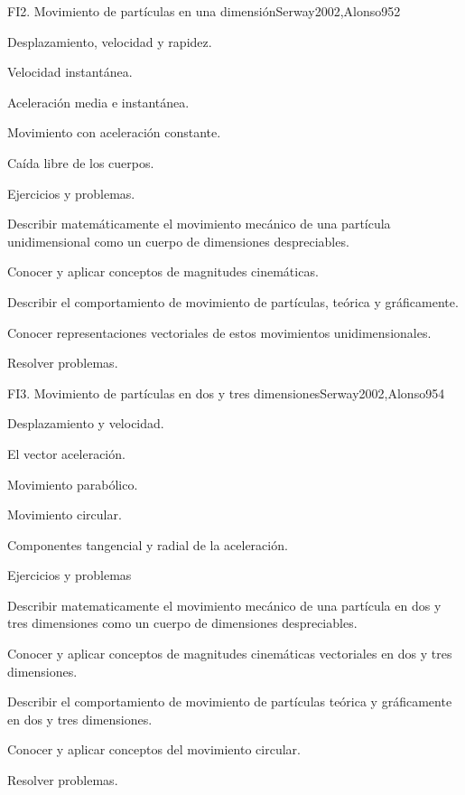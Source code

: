 \begin{syllabus}
\begin{unit}{FI2. Movimiento de partículas en una dimensión}{Serway2002,Alonso95}{2}
\begin{topics}
      \item Desplazamiento, velocidad y rapidez.
      \item Velocidad instantánea.
      \item Aceleración media e instantánea.
      \item Movimiento con aceleración constante.
      \item Caída libre de los cuerpos.
      \item Ejercicios y problemas.
    \end{topics}
   \begin{learningoutcomes}
      \item Describir matemáticamente el movimiento mecánico de una partícula unidimensional como un cuerpo de dimensiones despreciables.
      \item Conocer y aplicar conceptos de magnitudes cinemáticas.
      \item Describir el comportamiento de movimiento de partículas, teórica y gráficamente.
      \item Conocer representaciones vectoriales de estos movimientos unidimensionales.
      \item Resolver problemas.
   \end{learningoutcomes}
\end{unit}

\begin{unit}{FI3. Movimiento de partículas en dos y tres dimensiones}{Serway2002,Alonso95}{4}
\begin{topics}
      \item Desplazamiento y velocidad.
      \item El vector aceleración.
      \item Movimiento parabólico.
      \item Movimiento circular.
      \item Componentes tangencial y radial de la aceleración.
      \item Ejercicios y problemas
\end{topics}

   \begin{learningoutcomes}
      \item Describir matematicamente el movimiento mecánico de una partícula en dos y tres dimensiones como un cuerpo de dimensiones despreciables.
      \item Conocer y aplicar conceptos de magnitudes cinemáticas vectoriales en dos y tres dimensiones.
      \item Describir el comportamiento de movimiento de partículas teórica y gráficamente en dos y tres dimensiones.
      \item Conocer y aplicar conceptos del movimiento circular.
      \item Resolver problemas.
   \end{learningoutcomes}
\end{unit}


\end{syllabus}
